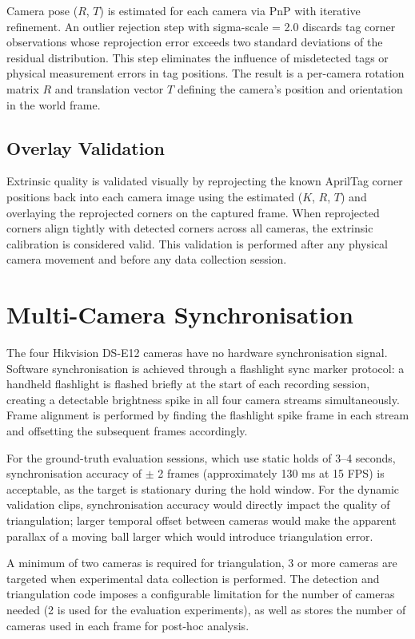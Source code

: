 Camera pose ($R$, $T$) is estimated for each camera via PnP with iterative refinement. An outlier rejection step with sigma-scale = 2.0 discards tag corner observations whose reprojection error exceeds two standard deviations of the residual distribution. This step eliminates the influence of misdetected tags or physical measurement errors in tag positions. The result is a per-camera rotation matrix $R$ and translation vector $T$ defining the camera's position and orientation in the world frame.

\subsection{Overlay Validation}

Extrinsic quality is validated visually by reprojecting the known AprilTag corner positions back into each camera image using the estimated ($K$, $R$, $T$) and overlaying the reprojected corners on the captured frame. When reprojected corners align tightly with detected corners across all cameras, the extrinsic calibration is considered valid. This validation is performed after any physical camera movement and before any data collection session.

\section{Multi-Camera Synchronisation}

The four Hikvision DS-E12 cameras have no hardware synchronisation signal. Software synchronisation is achieved through a flashlight sync marker protocol: a handheld flashlight is flashed briefly at the start of each recording session, creating a detectable brightness spike in all four camera streams simultaneously. Frame alignment is performed by finding the flashlight spike frame in each stream and offsetting the subsequent frames accordingly.

For the ground-truth evaluation sessions, which use static holds of 3--4 seconds, synchronisation accuracy of $\pm$ 2 frames (approximately 130 ms at 15 FPS) is acceptable, as the target is stationary during the hold window. For the dynamic validation clips, synchronisation accuracy would directly impact the quality of triangulation; larger temporal offset between cameras would make the apparent parallax of a moving ball larger which would introduce triangulation error.

A minimum of two cameras is required for triangulation, 3 or more cameras are targeted when experimental data collection is performed. The detection and triangulation code imposes a configurable limitation for the number of cameras needed (2 is used for the evaluation experiments), as well as stores the number of cameras used in each frame for post-hoc analysis.

